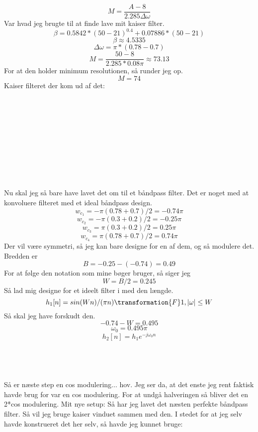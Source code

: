 \begin{Øvelser}
\begin{kapitel}
\begin{Øvelse}
            \[M=\frac{A-8}{2.285\Delta\omega}\]
            Var hvad jeg brugte til at finde lave mit kaiser filter. 
            \[\beta = 0.5842 * (50 - 21)^0.4 + 0.07886*(50 - 21)\]
            \[\beta \approx 4.5335\]
            \[\Delta \omega = \pi*(0.78 - 0.7)\]
            \[M = \frac{50 - 8}{2.285 * 0.08\pi} \approx 73.13\]
            For at den holder minimum resolutionen, så runder jeg op.
            \[M = 74\]
            Kaiser filteret der kom ud af det: 
            \\\\\\\\\\\\\\\\\\\\\\
            Nu skal jeg så bare have lavet det om til et båndpass filter. 
            Det er noget med at konvoluere filteret med et ideal båndpass design. 
            \[w_{c_1} = -\pi(0.78 + 0.7)/2 = -0.74\pi\]
            \[w_{c_2} = -\pi(0.3 + 0.2)/2 = -0.25\pi\]
            \[w_{c_3} = \pi(0.3 + 0.2)/2 = 0.25\pi\]
            \[w_{c_4} = \pi(0.78 + 0.7)/2 = 0.74\pi\]
            Der vil være symmetri, så jeg kan bare designe for en af dem, og så modulere det. 
            Bredden er 
            \[B = -0.25 - (-0.74) = 0.49\]
            For at følge den notation som mine bøger bruger, så siger jeg 
            \[W = B/2 = 0.245\]
            Så lad mig designe for et ideelt filter i med den længde. 
            \[h_1[n] = sin(W n)/(\pi n) \transformation{F} 1, |\omega| \leq W\]
            Så skal jeg have forskudt den. 
            \[-0.74 - W = 0.495\]
            \[\omega_0 = 0.495 \pi \]
            \[h_2[n] = h_1 e^{-j\omega_0n}\]
            \\\\\\\\
            Så er næste step en cos modulering... hov. Jeg ser da, at det enste jeg rent faktisk havde brug for var en cos modulering. 
            For at undgå halveringen så bliver det en 2*cos modulering. Mit nye setup: 
            Så har jeg lavet det næsten perfekte båndpass filter. Så vil jeg bruge kaiser vinduet sammen med den. 
            I stedet for at jeg selv havde konstrueret det her selv, så havde jeg kunnet bruge: 

\end{Øvelse}
\end{kapitel}
\end{Øvelser}
